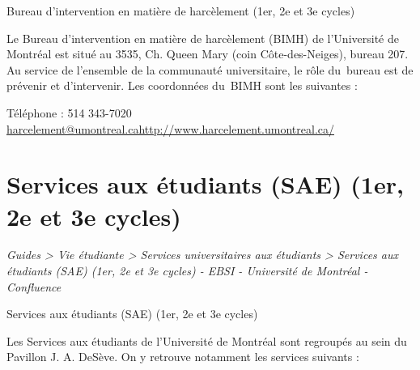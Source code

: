 \documentclass [12 pt]{article}
\begin{document}
        Bureau d'intervention en matière de harcèlement (1er, 2e et 3e cycles)
        
            Le Bureau d'intervention en matière de harcèlement (BIMH) de l'Université de Montréal
                est situé au 3535, Ch. Queen Mary (coin Côte-des-Neiges), bureau 207. Au service de
                l'ensemble de la communauté universitaire, le rôle du bureau est de prévenir et
                d'intervenir. Les coordonnées du BIMH sont les suivantes :
            
                Téléphone : 514 343-7020
        \href{
        http://www.harcelement.umontreal.ca/
        } {
        harcelement@umontreal.cahttp://www.harcelement.umontreal.ca/
        }
    
            
        
    
    
        \newpage
        \section {
        Services aux étudiants (SAE) (1er, 2e et 3e cycles)
        }
        
        
        
        \textit{
        Guides > Vie étudiante > Services universitaires aux étudiants > Services
            aux étudiants (SAE) (1er, 2e et 3e cycles) - EBSI - Université de Montréal -
            Confluence
        }
    
        Services aux étudiants (SAE) (1er, 2e et 3e cycles)
        
            Les Services aux étudiants de l'Université de Montréal sont regroupés au sein du
                Pavillon J. A. DeSève. On y retrouve notamment les services suivants :
            
\end{document}
